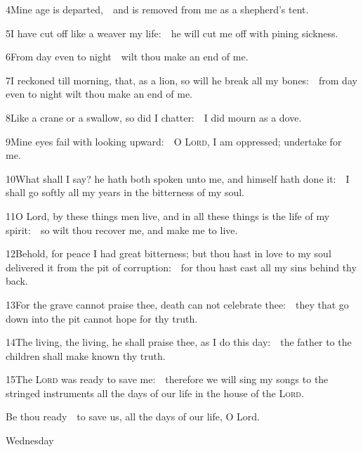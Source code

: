4\enspace Mine age is departed,\ \star\ and is removed from me as a shepherd’s tent.

5\enspace I have cut off like a weaver my life:\ \star\ he will cut me off with pining sickness.

6\enspace From day even to night\ \star\ wilt thou make an end of me.

7\enspace I reckoned till morning, that, as a lion, so will he break all my bones:\ \star\ from day even to night wilt thou make an end of me.

8\enspace Like a crane or a swallow, so did I chatter:\ \star\ I did mourn as a dove.

9\enspace Mine eyes fail with looking upward:\ \star\ O {\scshape Lord}, I am oppressed; undertake for me.

10\enspace What shall I say? he hath both spoken unto me, and himself hath done it:\ \star\ I shall go softly all my years in the bitterness of my soul.

11\enspace O Lord, by these things men live, and in all these things is the life of my spirit:\ \star\ so wilt thou recover me, and make me to live.

12\enspace Behold, for peace I had great bitterness; but thou hast in love to my soul delivered it from the pit of corruption:\ \star\ for thou hast cast all my sins behind thy back.

13\enspace For the grave cannot praise thee, death can not celebrate thee:\ \star\ they that go down into the pit cannot hope for thy truth.

14\enspace The living, the living, he shall praise thee, as I do this day:\ \star\ the father to the children shall make known thy truth.

15\enspace The {\scshape Lord} was ready to save me:\ \star\ therefore we will sing my songs to the stringed instruments all the days of our life in the house of the {\scshape Lord}.

 Be thou ready\ \star\ to save us, all the days of our life, O Lord.

\medskip

\centerline{Wednesday}
\subsection{}

